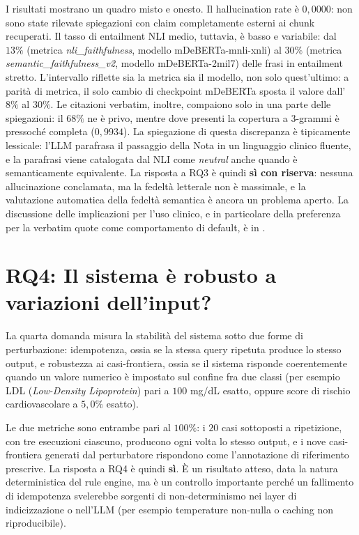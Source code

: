 I risultati mostrano un quadro misto e onesto. Il hallucination rate è $0{,}0000$: non sono state rilevate spiegazioni con claim completamente esterni ai chunk recuperati. Il tasso di entailment NLI medio, tuttavia, è basso e variabile: dal $13\%$ (metrica \emph{nli\_faithfulness}, modello mDeBERTa-mnli-xnli) al $30\%$ (metrica \emph{semantic\_faithfulness\_v2}, modello mDeBERTa-2mil7) delle frasi in entailment stretto. L'intervallo riflette sia la metrica sia il modello, non solo quest'ultimo: a parità di metrica, il solo cambio di checkpoint mDeBERTa sposta il valore dall'$8\%$ al $30\%$. Le citazioni verbatim, inoltre, compaiono solo in una parte delle spiegazioni: il $68\%$ ne è privo, mentre dove presenti la copertura a 3-grammi è pressoché completa ($0{,}9934$). La spiegazione di questa discrepanza è tipicamente lessicale: l'LLM parafrasa il passaggio della Nota in un linguaggio clinico fluente, e la parafrasi viene catalogata dal NLI come \emph{neutral} anche quando è semanticamente equivalente. La risposta a RQ3 è quindi \textbf{sì con riserva}: nessuna allucinazione conclamata, ma la fedeltà letterale non è massimale, e la valutazione automatica della fedeltà semantica è ancora un problema aperto. La discussione delle implicazioni per l'uso clinico, e in particolare della preferenza per la verbatim quote come comportamento di default, è in .

\section{RQ4: Il sistema è robusto a variazioni dell'input?}
\label{sec:rq4}

La quarta domanda misura la stabilità del sistema sotto due forme di perturbazione: idempotenza, ossia se la stessa query ripetuta produce lo stesso output, e robustezza ai casi-frontiera, ossia se il sistema risponde coerentemente quando un valore numerico è impostato sul confine fra due classi (per esempio LDL (\emph{Low-Density Lipoprotein}) pari a $100$ mg/dL esatto, oppure score di rischio cardiovascolare a $5{,}0\%$ esatto).

Le due metriche sono entrambe pari al $100\%$: i $20$ casi sottoposti a ripetizione, con tre esecuzioni ciascuno, producono ogni volta lo stesso output, e i nove casi-frontiera generati dal perturbatore rispondono come l'annotazione di riferimento prescrive. La risposta a RQ4 è quindi \textbf{sì}. È un risultato atteso, data la natura deterministica del rule engine, ma è un controllo importante perché un fallimento di idempotenza svelerebbe sorgenti di non-determinismo nei layer di indicizzazione o nell'LLM (per esempio temperature non-nulla o caching non riproducibile).

